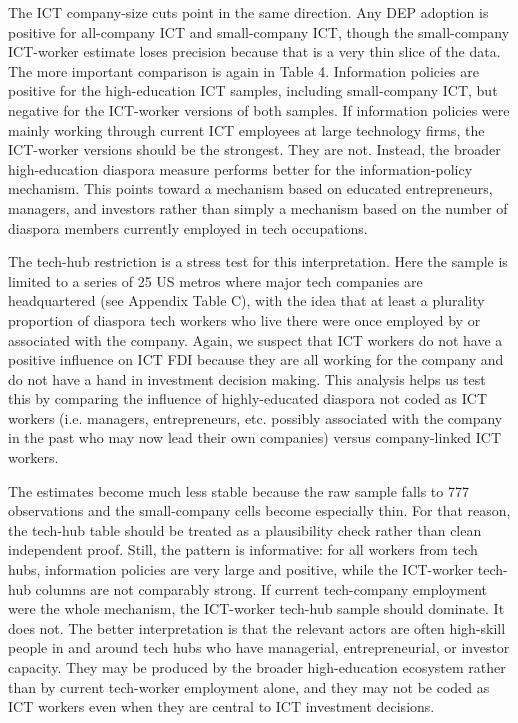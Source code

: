 \documentclass[doublespace,nopageskip]{UVAthesis}
\begin{document}




The ICT company-size cuts point in the same direction. Any DEP adoption is positive for all-company ICT and small-company ICT, though the small-company ICT-worker estimate loses precision because that is a very thin slice of the data. The more important comparison is again in Table 4. Information policies are positive for the high-education ICT samples, including small-company ICT, but negative for the ICT-worker versions of both samples. If information policies were mainly working through current ICT employees at large technology firms, the ICT-worker versions should be the strongest. They are not. Instead, the broader high-education diaspora measure performs better for the information-policy mechanism. This points toward a mechanism based on educated entrepreneurs, managers, and investors rather than simply a mechanism based on the number of diaspora members currently employed in tech occupations.




The tech-hub restriction is a stress test for this interpretation. Here the sample is limited to a series of 25 US metros where major tech companies are headquartered (see Appendix Table C), with the idea that at least a plurality proportion of diaspora tech workers who live there were once employed by or associated with the company. Again, we suspect that ICT workers do not have a positive influence on ICT FDI because they are all working for the company and do not have a hand in investment decision making. This analysis helps us test this by comparing the influence of highly-educated diaspora not coded as ICT workers (i.e. managers, entrepreneurs, etc. possibly associated with the company in the past who may now lead their own companies) versus company-linked ICT workers.

The estimates become much less stable because the raw sample falls to 777 observations and the small-company cells become especially thin. For that reason, the tech-hub table should be treated as a plausibility check rather than clean independent proof. Still, the pattern is informative: for all workers from tech hubs, information policies are very large and positive, while the ICT-worker tech-hub columns are not comparably strong. If current tech-company employment were the whole mechanism, the ICT-worker tech-hub sample should dominate. It does not. The better interpretation is that the relevant actors are often high-skill people in and around tech hubs who have managerial, entrepreneurial, or investor capacity. They may be produced by the broader high-education ecosystem rather than by current tech-worker employment alone, and they may not be coded as ICT workers even when they are central to ICT investment decisions.
\end{document}
